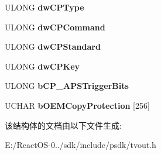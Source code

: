 \begin{DoxyCompactItemize}
U\+L\+O\+NG {\bfseries dw\+C\+P\+Type}
\item 
\mbox{\label{struct___v_i_d_e_o_p_a_r_a_m_e_t_e_r_s_a3d998274484547f23516c078227b4862}} 
U\+L\+O\+NG {\bfseries dw\+C\+P\+Command}
\item 
\mbox{\label{struct___v_i_d_e_o_p_a_r_a_m_e_t_e_r_s_ae163d65ff92fb28481014570afcbeb02}} 
U\+L\+O\+NG {\bfseries dw\+C\+P\+Standard}
\item 
\mbox{\label{struct___v_i_d_e_o_p_a_r_a_m_e_t_e_r_s_a1dbdce793dcd77c4ec575a82fafeff3b}} 
U\+L\+O\+NG {\bfseries dw\+C\+P\+Key}
\item 
\mbox{\label{struct___v_i_d_e_o_p_a_r_a_m_e_t_e_r_s_a72511fc00a61ee0d19b3f594d095455f}} 
U\+L\+O\+NG {\bfseries b\+C\+P\+\_\+\+A\+P\+S\+Trigger\+Bits}
\item 
\mbox{\label{struct___v_i_d_e_o_p_a_r_a_m_e_t_e_r_s_ae2f8d8d02fd3fa695d9613d6eef26b34}} 
U\+C\+H\+AR {\bfseries b\+O\+E\+M\+Copy\+Protection} \mbox{[}256\mbox{]}
\end{DoxyCompactItemize}


该结构体的文档由以下文件生成\+:\begin{DoxyCompactItemize}
\item 
E\+:/\+React\+O\+S-\/0../sdk/include/psdk/tvout.\+h\end{DoxyCompactItemize}
